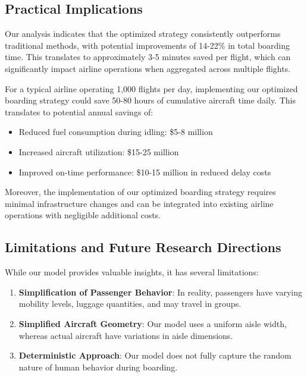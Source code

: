 \documentclass[a4paper,12pt]{article}
\begin{document}
\subsection{Practical Implications}

Our analysis indicates that the optimized strategy consistently outperforms traditional methods, with potential improvements of 14-22\% in total boarding time. This translates to approximately 3-5 minutes saved per flight, which can significantly impact airline operations when aggregated across multiple flights.

For a typical airline operating 1,000 flights per day, implementing our optimized boarding strategy could save 50-80 hours of cumulative aircraft time daily. This translates to potential annual savings of:
\begin{itemize}
    \item Reduced fuel consumption during idling: \$5-8 million
    \item Increased aircraft utilization: \$15-25 million
    \item Improved on-time performance: \$10-15 million in reduced delay costs
\end{itemize}

Moreover, the implementation of our optimized boarding strategy requires minimal infrastructure changes and can be integrated into existing airline operations with negligible additional costs.

\subsection{Limitations and Future Research Directions}

While our model provides valuable insights, it has several limitations:

\begin{enumerate}
    \item \textbf{Simplification of Passenger Behavior}: In reality, passengers have varying mobility levels, luggage quantities, and may travel in groups.

    \item \textbf{Simplified Aircraft Geometry}: Our model uses a uniform aisle width, whereas actual aircraft have variations in aisle dimensions.

    \item \textbf{Deterministic Approach}: Our model does not fully capture the random nature of human behavior during boarding.
\end{enumerate}
\end{document}
